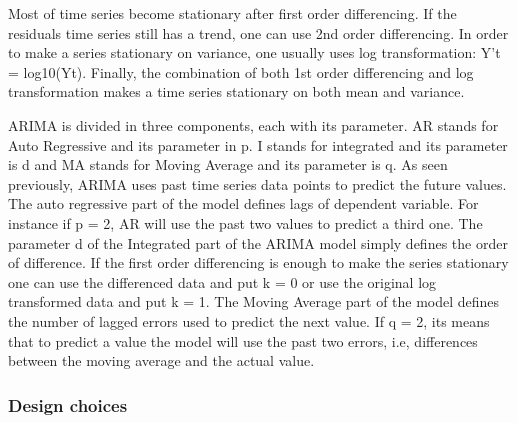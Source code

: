 \documentclass{article} %
\begin{document}
Most of time series become stationary after first order differencing. If the residuals time series still has a trend, one can use 2nd order differencing.
In order to make a series stationary on variance, one usually uses log transformation: Y’t = log10(Yt).
Finally, the combination of both 1st order differencing and log transformation makes a time series stationary on both mean and variance.

ARIMA is divided in three components, each with its parameter. AR stands for Auto Regressive and its parameter in p. I stands for integrated and its parameter is d and MA stands for Moving Average and its parameter is q.
As seen previously, ARIMA uses past time series data points to predict the future values. The auto regressive part of the model defines lags of dependent variable. For instance if p = 2, AR will use the past two values to predict a third one.
The parameter d of the Integrated part of the ARIMA model simply defines the order of difference. If the first order differencing is enough to make the series stationary one can use the differenced data and put k = 0 or use the original log transformed data and put k = 1.
The Moving Average part of the model defines the number of lagged errors used to predict the next value. If q = 2, its means that to predict a value the model will use the past two errors, i.e, differences between the moving average and the actual value.

\subsubsection*{Design choices}
\end{document}

